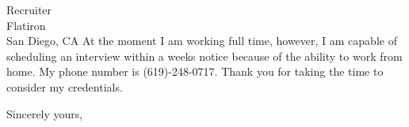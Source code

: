 \documentclass{letter} %
\begin{document}
\begin{letter}{Recruiter \\
Flatiron \\
San Diego, CA}
\noindent At the moment I am working full time, however, I am capable of scheduling an interview within a weeks notice because of the ability to work from home.  My phone number is (619)-248-0717.  Thank you for taking the time to consider my credentials.
 
\closing{Sincerely yours,} 
 

 

\end{letter}
 
\end{document}
